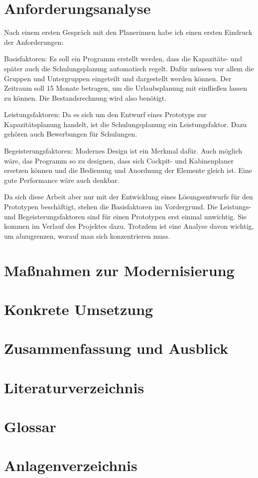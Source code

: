 \documentclass [12pt, a4paper, oneside, titlepage, ngerman]{article}
\begin{document}
\section {Anforderungsanalyse}
Nach einem ersten Gespräch mit den Planerinnen habe ich einen ersten Eindruck der Anforderungen: 
\begin{description}
\item Basisfaktoren: Es soll ein Programm erstellt werden, dass die Kapazitäts- und später auch die Schulungsplanung automatisch regelt. Dafür müssen vor allem die Gruppen und Untergruppen eingeteilt und dargestellt werden können. Der Zeitraum soll 15 Monate betragen, um die Urlaubsplanung mit einfließen lassen zu können. Die Bestandsrechnung wird also benötigt.
\item Leistungsfaktoren: Da es sich um den Entwurf eines Prototyps zur Kapazitätsplanung handelt, ist die Schulungsplanung ein Leistungsfaktor. Dazu gehören auch Bewerbungen für Schulungen.
\item Begeisterungsfaktoren: Modernes Design ist ein Merkmal dafür. Auch möglich wäre, das Programm so zu designen, dass sich Cockpit- und Kabinenplaner ersetzen können und die Bedienung und Anordnung der Elemente gleich ist. Eine gute Performance wäre auch denkbar.
\end{description}
Da sich diese Arbeit aber nur mit der Entwicklung eines Lösungsentwurfs für den Prototypen beschäftigt, stehen die Basisfaktoren im Vordergrund. Die Leistungs- und Begeisterungsfaktoren sind für einen Prototypen erst einmal unwichtig. Sie kommen im Verlauf des Projektes dazu. Trotzdem ist eine Analyse davon wichtig, um abzugrenzen, worauf man sich konzentrieren muss.
\newpage

\section {Maßnahmen zur Modernisierung}
\newpage

\section {Konkrete Umsetzung}
\newpage

\section {Zusammenfassung und Ausblick}
\newpage

\section*{Literaturverzeichnis}



\newpage

\setcounter{page}{4}
\section* {Glossar}
\newpage

\section* {Anlagenverzeichnis}
\newpage
\end{document}
